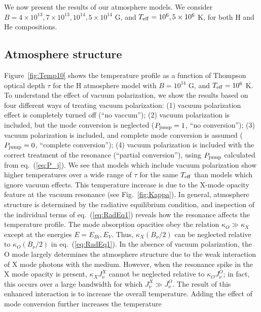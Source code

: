 \documentclass[useAMS,onecolumn,usenatbib,usegraphicx]{mn2e}
\begin{document}
We now present the results of our atmosphere models.  We consider $B=4\times 10^{13}, 7\times 10^{13}, 
10^{14}, 5\times 10^{14}$ G, and $T_{\rm eff}=10^6, 5\times 10^6$ K, for both H and He compositions.


\subsection{Atmosphere structure}
\label{subsect:AtmoStruct}

Figure~\ref{fig:Temp10} shows the temperature profile 
as a function of Thompson optical depth $\tau$ for the H atmosphere model with 
$B=10^{14}$ G, and $T_{\rm eff}=10^6$ K.  
To understand the effect of vacuum polarization, we show the results based on 
four different ways of treating vacuum polarization: (1) vacuum polarization effect 
is completely turned off (``no vaccum''); (2) vacuum polarization is included, but 
the mode conversion is neglected ($P_{\rm jump}=1$, ``no conversion''); (3) vacuum polarization 
is included, and complete mode conversion is assumed ($P_{\rm jump}=0$, ``complete conversion''); 
(4) vacuum polarization is included with the correct treatment of the resonance 
(``partial conversion''), using $P_{\rm jump}$ 
calculated from eq.~(\ref{eq:P_j}).
We see that models which include vacuum polarization 
show higher temperatures over a wide range of $\tau$ 
for the same $T_{\rm eff}$ than models which ignore vacuum effects.
This temperature increase 
is due to the X-mode opacity feature at the vacuum resonance (see Fig.~\ref{fig:Kappa}).
In general, 
atmosphere structure is determined by the radiative equilibrium condition, 
and 
inspection of  the individual terms of eq.~(\ref{eq:RadEq1}) reveals 
how the resonance affects the temperature profile.  The mode 
absorption opacities obey the relation $\kappa_O\gg\kappa_X$ 
except at the energies $E=E_{Bi},E_V$.  Thus, $\kappa_X(B_{\nu}/2)$ 
can be neglected relative to $\kappa_O(B_{\nu}/2)$ in eq.~(\ref{eq:RadEq1}).  
In the absence of vacuum polarization, the O mode largely 
determines the atmosphere structure due to the weak interaction 
of X mode photons with the medium.  However, when the resonance 
spike in the X mode opacity is present, $\kappa_X J^X_{\nu}$ cannot 
be neglected relative to $\kappa_O J^O_{\nu}$; in fact, this occurs 
over a large bandwidth for which $J^X_{\nu}\gg J^O_{\nu}$.  The 
result of this enhanced interaction is to increase the overall temperature.
Adding the effect of mode conversion further increases the temperature 
\end{document}
